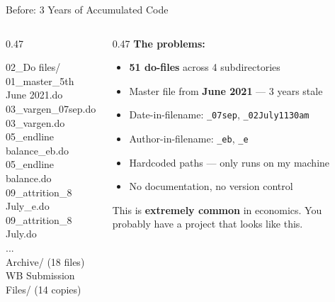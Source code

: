 \documentclass[aspectratio=169, 10pt]{beamer}
\begin{document}
\begin{frame}[fragile]{Before: 3 Years of Accumulated Code}
\vskip-4pt
\begin{columns}[T]
\begin{column}{0.47\textwidth}
\begin{tcolorbox}[colback=DarkSlate, colframe=SoftCoral, boxrule=0.8pt, arc=2pt,
  left=4pt, right=4pt, top=3pt, bottom=3pt]
{\color{CoolGray}\ttfamily\tiny
02\_Do files/\\
\hspace{0.6em}01\_master\_5th June 2021.do\\
\hspace{0.6em}03\_vargen\_07sep.do\\
\hspace{0.6em}03\_vargen.do\\
\hspace{0.6em}05\_endline balance\_eb.do\\
\hspace{0.6em}05\_endline balance.do\\
\hspace{0.6em}09\_attrition\_8 July\_e.do\\
\hspace{0.6em}09\_attrition\_8 July.do\\
\hspace{0.6em}...\\
\hspace{0.6em}Archive/ {\color{CoolGray!50}(18 files)}\\
\hspace{0.6em}WB Submission Files/ {\color{CoolGray!50}(14 copies)}
}
\end{tcolorbox}
\end{column}
\begin{column}{0.47\textwidth}
{\small\color{SoftCoral}\textbf{The problems:}}
\vskip3pt
\small
\begin{itemize}\setlength{\itemsep}{2pt}
  \item \textbf{51 do-files} across 4 subdirectories
  \item Master file from \textbf{June 2021} --- 3 years stale
  \item Date-in-filename: \texttt{\_07sep}, \texttt{\_02July1130am}
  \item Author-in-filename: \texttt{\_eb}, \texttt{\_e}
  \item Hardcoded paths --- only runs on my machine
  \item No documentation, no version control
\end{itemize}
\vskip3pt
\begin{tcolorbox}[quotebox, top=2pt, bottom=2pt]
\scriptsize This is \textbf{extremely common} in economics. You probably have a project that looks like this.
\end{tcolorbox}
\end{column}
\end{columns}
\end{frame}
\end{document}
